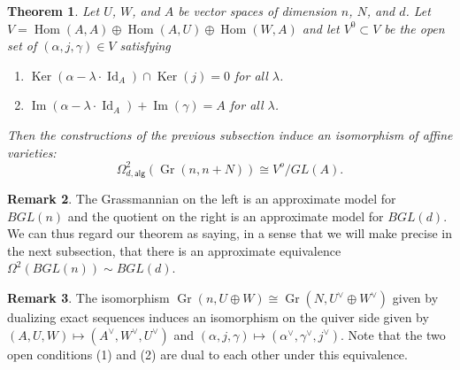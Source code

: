 \documentclass{amsart}
\newtheorem{theorem}{Theorem}[section]
\theoremstyle{definition}
\newtheorem{remark}[theorem]{Remark}
\newcommand{\Hom}{\operatorname{Hom}}
\newcommand{\Ker}{\operatorname{Ker}}
\newcommand{\im}{\operatorname{Im}}
\newcommand{\alg}{\mathsf{alg}}
\newcommand{\Gr}{\operatorname{Gr}}
\newcommand{\LoopTwo}{\Omega^{2}_{d,\alg}}
\newcommand{\Id}{\operatorname{Id}}
\begin{document}
\begin{theorem}\label{thm: quiver description of loop2 of Gr}
Let $U$, $W$, and $A$ be vector spaces of dimension $n$, $N$, and
$d$. Let $V = \Hom (A,A)\oplus \Hom (A,U)\oplus \Hom (W,A)$ and let
$V^{0}\subset V$ be the open set of $(\alpha ,j,\gamma )\in V$
satisfying
\begin{enumerate}
\item $\Ker (\alpha -\lambda \cdot \Id_{A})\cap \Ker (j) = 0$ for all
$\lambda$.
\item  $\im (\alpha -\lambda \cdot \Id_{A})+ \im (\gamma )=A$ for
all $\lambda$.
\end{enumerate}
Then the constructions of the previous subsection induce an
isomorphism of affine varieties:
\[
\LoopTwo (\Gr (n,n+N))\cong V^{o}/GL(A) .
\]
\end{theorem}
\begin{remark}\label{rem: Gr(n,n+N) is a model for BGL(n) and Vo/GL(A) is a model for BGL(d)}
The Grassmannian on the left is an approximate model for $BGL(n)$ and
the quotient on the right is an approximate model for $BGL(d)$. We can
thus regard our theorem as saying, in a sense that we will make
precise in the next subsection, that there is an approximate
equivalence $\Omega^{2}(BGL(n))\sim BGL(d)$.
\end{remark}

\begin{remark}\label{rem: duality induced by Gr(n,n+N)=Gr(N,n+N)}
The isomorphism $\Gr (n,U\oplus W)\cong \Gr (N,U^{\vee}\oplus
W^{\vee})$ given by dualizing exact sequences induces an isomorphism
on the quiver side given by $(A,U,W)\mapsto
(A^{\vee},W^{\vee},U^{\vee})$ and $(\alpha ,j,\gamma )\mapsto
(\alpha^{\vee},\gamma^{\vee},j^{\vee})$. Note that the two open
conditions (1) and (2) are dual to each other under this equivalence. 
\end{remark}
\end{document}
